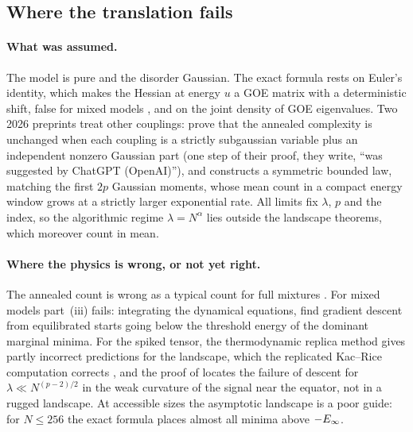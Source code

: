 \begin{refsection}
\section{Where the translation fails}\label{sec:kacrice:fails}

\paragraph{What was assumed.} The model is pure and the disorder Gaussian. The exact formula rests on Euler's identity, which makes the Hessian at energy $u$ a GOE matrix with a deterministic shift, false for mixed models \parencite{AuffingerBenArous2013}, and on the joint density of GOE eigenvalues. Two 2026 preprints treat other couplings: \textcite{ChenLuSen2026} prove that the annealed complexity is unchanged when each coupling is a strictly subgaussian variable plus an independent nonzero Gaussian part (one step of their proof, they write, \enquote{was suggested by ChatGPT (OpenAI)}), and \textcite{Kim2026} constructs a symmetric bounded law, matching the first $2p$ Gaussian moments, whose mean count in a compact energy window grows at a strictly larger exponential rate. All limits fix $\lambda$, $p$ and the index, so the algorithmic regime $\lambda=N^\alpha$ lies outside the landscape theorems, which moreover count in mean.

\paragraph{Where the physics is wrong, or not yet right.} The annealed count is wrong as a typical count for full mixtures \parencite{AuffingerBenArous2013}. For mixed models part~(iii) fails: integrating the dynamical equations, \textcite{FolenaFranzRicciTersenghi2020} find gradient descent from equilibrated starts going below the threshold energy of the dominant marginal minima. For the spiked tensor, the thermodynamic replica method gives partly incorrect predictions for the landscape, which the replicated Kac--Rice computation corrects \parencite{RosEtAl2019}, and the proof of \textcite{BenArousGheissariJagannath2020} locates the failure of descent for $\lambda\ll N^{(p-2)/2}$ in the weak curvature of the signal near the equator, not in a rugged landscape. At accessible sizes the asymptotic landscape is a poor guide: for $N\le256$ the exact formula places almost all minima above $-E_\infty$.


\end{refsection}
